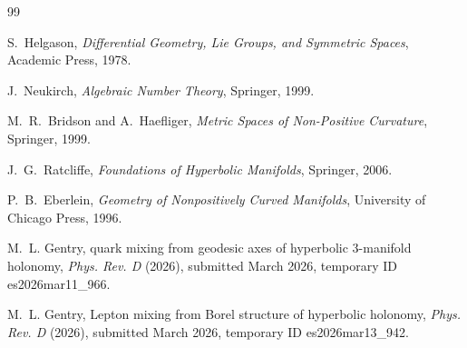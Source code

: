 \documentclass[12pt]{article}
\theoremstyle{definition}
\theoremstyle{remark}
\begin{document}
\begin{thebibliography}{99}

S.~Helgason,
\emph{Differential Geometry, Lie Groups, and Symmetric Spaces},
Academic Press, 1978.

J.~Neukirch,
\emph{Algebraic Number Theory},
Springer, 1999.

M.~R.~Bridson and A.~Haefliger,
\emph{Metric Spaces of Non-Positive Curvature},
Springer, 1999.

J.~G.~Ratcliffe,
\emph{Foundations of Hyperbolic Manifolds},
Springer, 2006.

P.~B.~Eberlein,
\emph{Geometry of Nonpositively Curved Manifolds},
University of Chicago Press, 1996.


M.~L. Gentry,
 quark mixing from geodesic axes of hyperbolic 3-manifold holonomy,
\newblock \emph{Phys. Rev. D} (2026), submitted March 2026, temporary {ID} es2026mar11\_966.

M.~L. Gentry,
\newblock Lepton mixing from Borel structure of hyperbolic holonomy,
\newblock \emph{Phys. Rev. D} (2026), submitted March 2026, temporary {ID} es2026mar13\_942.
\end{thebibliography}
\end{document}
